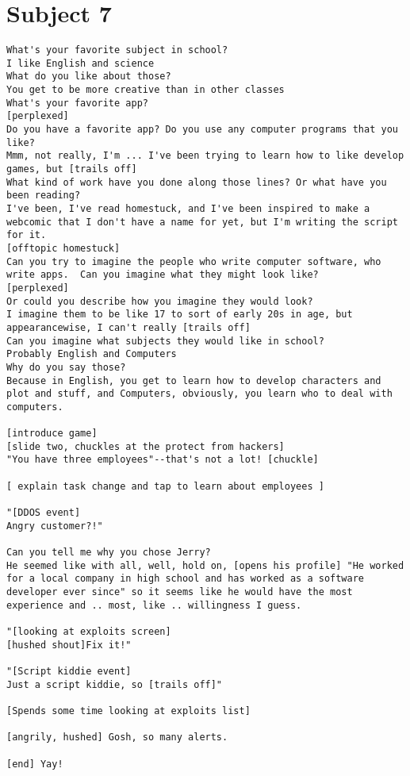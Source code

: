 \clearpage\section*{Subject 7}
\begin{lstlisting}
What's your favorite subject in school?
I like English and science
What do you like about those?
You get to be more creative than in other classes
What's your favorite app?
[perplexed]
Do you have a favorite app? Do you use any computer programs that you like?
Mmm, not really, I'm ... I've been trying to learn how to like develop games, but [trails off]
What kind of work have you done along those lines? Or what have you been reading?
I've been, I've read homestuck, and I've been inspired to make a webcomic that I don't have a name for yet, but I'm writing the script for it.
[offtopic homestuck]
Can you try to imagine the people who write computer software, who write apps.  Can you imagine what they might look like?
[perplexed]
Or could you describe how you imagine they would look?
I imagine them to be like 17 to sort of early 20s in age, but appearancewise, I can't really [trails off]
Can you imagine what subjects they would like in school?
Probably English and Computers
Why do you say those?
Because in English, you get to learn how to develop characters and plot and stuff, and Computers, obviously, you learn who to deal with computers.

[introduce game]
[slide two, chuckles at the protect from hackers]
"You have three employees"--that's not a lot! [chuckle]

[ explain task change and tap to learn about employees ]

"[DDOS event]
Angry customer?!"

Can you tell me why you chose Jerry?
He seemed like with all, well, hold on, [opens his profile] "He worked for a local company in high school and has worked as a software developer ever since" so it seems like he would have the most experience and .. most, like .. willingness I guess.

"[looking at exploits screen]
[hushed shout]Fix it!"

"[Script kiddie event]
Just a script kiddie, so [trails off]"

[Spends some time looking at exploits list]

[angrily, hushed] Gosh, so many alerts.

[end] Yay!


\end{lstlisting}
